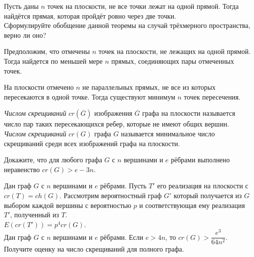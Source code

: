 \documentclass[14pt,DIV14]{scrartcl}
\begin{document}

\begin{task}
\sub Пусть даны $n$ точек на плоскости, не все точки лежат на одной прямой. Тогда найдётся прямая,
которая пройдёт ровно через две точки.\\
\sub Сформулируйте обобщение  данной теоремы на случай трёхмерного пространства,  верно ли оно?
\end{task}

\begin{task}
Предположим, что отмечены $n$ точек на плоскости,
не лежащих на одной прямой. Тогда найдется по меньшей мере $n$
прямых, соединяющих пары отмеченных точек.
\end{task}

\begin{exercise}
На плоскости отмечено  $n$ не параллельных прямых, не все из которых пересекаются в одной точке. Тогда существуют минимум $n$ точек пересечения. 
\end{exercise}

\begin{definition}
\emph{Числом скрещиваний} $cr(\overline{G})$ изображения $\overline{G}$ графа на плоскости называется число пар таких пересекающихся ребер, которые не
имеют общих вершин.\\
\emph{Числом скрещиваний} $cr(G)$ графа $G$ называется минимальное
число скрещиваний среди всех изображений графа на плоскости.
\end{definition}


\begin{task}
Докажите, что для любого графа $G$ с $n$ вершинами и $e$ рёбрами выполнено неравенство $cr(G) > e - 3n$.
\end{task}


\begin{task}
Дан граф $G$ с $n$ вершинами и $e$ рёбрами. Пусть $T'$ его реализация на плоскости с $cr(T)=ch(G)$. Рассмотрим вероятностный граф $G'$ который получается из $G$ выбором каждой вершины с вероятностью $p$ и соответствующая ему реализация $T'$, полученный из $T$.\\ 
\sub $E(cr(T'))=p^4cr(G)$.\\
\sub Дан граф $G$ с $n$ вершинами и $e$ рёбрами. Если $e > 4n$, то $cr(G) > \dfrac{e^3}{64n^2}$.\\
\sub Получите оценку на число скрещиваний для полного графа.
\end{task}
\end{document}
